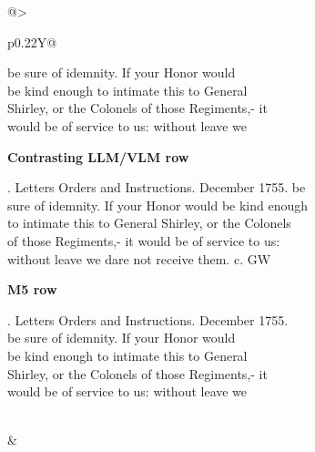 \begin{table}[p]
\begin{tabularx}{\linewidth}{@{}>{\raggedright\arraybackslash}p{0.22\linewidth}Y@{}}
\begin{minipage}[t]{\hsize}
{      be sure of idemnity. If your Honor would\excerptnl\\
      be kind enough to intimate this to General\excerptnl\\
      Shirley, or the Colonels of those Regiments,- it\excerptnl\\
      would be of service to us: without leave we\par}
      \vspace{0.3em}
      \textbf{Contrasting LLM/VLM row}\par
      {\raggedright{}. Letters Orders and Instructions. December 1755. be\excerptnl\\
      sure of idemnity. If your Honor would be kind enough\excerptnl\\
      to intimate this to General Shirley, or the Colonels\excerptnl\\
      of those Regiments,- it would be of service to us:\excerptnl\\
      without leave we dare not receive them. c. GW\par}
      \vspace{0.3em}
      \textbf{M5 row}\par
      {\raggedright{}. Letters Orders and Instructions. December 1755.\excerptnl\\
      be sure of idemnity. If your Honor would\excerptnl\\
      be kind enough to intimate this to General\excerptnl\\
      Shirley, or the Colonels of those Regiments,- it\excerptnl\\
      would be of service to us: without leave we\par}
    \end{minipage}
    \\
    &
    \begin{minipage}[t]{\hsize}

\end{minipage}
\end{tabularx}
\end{table}
